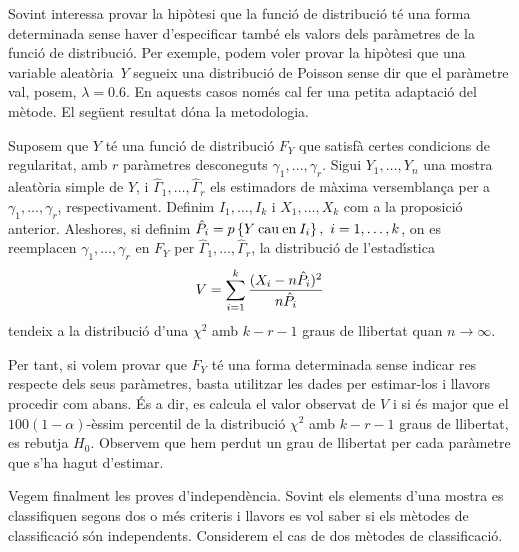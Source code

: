 Sovint interessa provar la hip\`otesi que la funci\'o de distribuci\'o 
t\'e una forma 
determinada sense haver d'especificar tamb\'e els valors dels 
par\`ametres de la funci\'o de distribuci\'o. Per exemple, 
podem voler provar la hip\`otesi que una variable aleat\`oria~$Y$ 
segueix una distribuci\'o de Poisson sense dir que el
par\`ametre val, posem, $\lambda = 0.6$. En aquests casos nom\'es cal 
fer una petita adaptaci\'o del m\`etode. El seg\"uent resultat d\'ona la metodologia.

\begin{proposition}
Suposem que $Y$ t\'e una funci\'o de distribuci\'o 
$F_Y$ que satisf\`a certes condicions de regularitat, 
amb $r$ par\`ametres 
desconeguts $\gamma_1, \ldots , \gamma_r$.
Sigui $Y_1, \ldots , Y_n$ una mostra aleat\`oria simple de $Y$, i 
$\hat{\Gamma}_1,\ldots , \hat{\Gamma}_r$ els estimadors 
de m\`axima versemblan\c{c}a per a $\gamma_1,
\ldots , \gamma_r$, respectivament. Definim $I_1, \ldots , I_k$ i $X_1, \ldots ,
X_k$ com a la proposici\'o anterior. 
Aleshores, si definim $\hat{P}_i = p\left\{Y \> {\rm
cau \> en \> } I_i\right\}, \ i = 1, \ldots , k$, on es reemplacen $\gamma_1, \ldots ,
\gamma_r$ en $F_Y$ per $\hat{\Gamma}_1, \ldots , \hat{\Gamma}_r$, la distribuci\'o
de l'estad\'{\i}stica
$$V= \sum_{i=1}^k {(X_i - n \hat{P}_i)^2 \over n \hat{P}_i}$$
tendeix a la distribuci\'o d'una $\chi^2$ amb $k-r-1$ graus de llibertat quan $n
\to \infty$.
\end{proposition}

Per tant, si volem provar que $F_Y$ t\'e una forma determinada sense 
indicar res respecte dels seus par\`ametres,
 basta utilitzar les dades per
estimar-los i llavors procedir com abans. \'Es a dir, es calcula el valor
observat de $V$ i si \'es major que el $100(1-\alpha)$-\`essim percentil de la
distribuci\'o $\chi^2$ amb $k-r-1$ graus de llibertat, es rebutja $H_0$. 
Observem que hem perdut un grau de llibertat per cada par\`ametre que 
s'ha hagut d'estimar.

Vegem finalment les proves d'independ\`encia.
Sovint els elements d'una mostra es classifiquen segons dos o m\'es 
criteris i llavors es vol saber si els m\`etodes de
 classificaci\'o s\'on independents. 
Considerem el cas de dos m\`etodes de
classificaci\'o.

